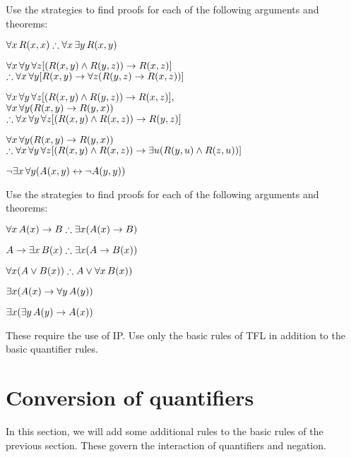 \problempart
Use the strategies to find proofs for each of the following arguments and theorems:
\begin{compactlist}
\item $\forall x\,\atom{R}{x,x} \therefore \forall x\,\exists y\,\atom{R}{x,y}$
\item $\forall x\,\forall y\,\forall z[(R(x,y) \wedge R(y,z)) \rightarrow R(x,z)]$ \\
$\therefore \forall x\,\forall y[\atom{R}{x,y} \eif \forall z(\atom{R}{y,z} \eif \atom{R}{x,z})]$
\item $\forall x\,\forall y\,\forall z[(R(x,y) \wedge R(y,z)) \rightarrow R(x,z)],$\\ $\forall x\,\forall y(R(x,y) \rightarrow R(y, x))$ \\ $\therefore \forall x\,\forall y\,\forall z[(\atom{R}{x,y} \eand \atom{R}{x,z}) \eif \atom{R}{y,z}]$
\item $\forall x\,\forall y(R(x,y) \rightarrow R(y, x))$ \\$\therefore \forall x\,\forall y\,\forall z[(\atom{R}{x,y} \eand \atom{R}{x,z}) \eif \exists u(\atom{R}{y,u} \eand \atom{R}{z,u})]$
\item $\neg \exists x\,\forall y (A(x, y) \leftrightarrow \lnot A(y, y))$
\end{compactlist}

\problempart
Use the strategies to find proofs for each of the following arguments and theorems:
\begin{compactlist}
\item $\forall x\,\atom{A}{x} \eif B \therefore \exists x(\atom{A}{x} \eif B)$
\item $A \eif \exists x\, \atom{B}{x} \therefore \exists x(A \eif \atom{B}{x})$
\item $\forall x(A \eor \atom{B}{x}) \therefore A \eor \forall x\,\atom{B}{x})$
\item $\exists x(A(x) \rightarrow \forall y\,A(y))$
\item $\exists x(\exists y\,A(y) \rightarrow A(x))$
\end{compactlist}
These require the use of IP. Use only the basic rules of TFL in addition to the basic quantifier rules.

\chapter{Conversion of quantifiers}\label{s:CQ}

In this section, we will add some additional rules to the basic rules of the previous section. These govern the interaction of quantifiers and negation.
 
